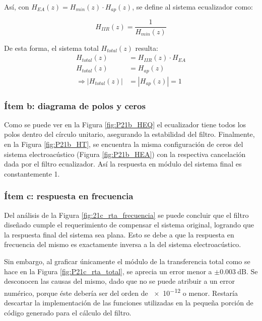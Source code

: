 	Así, con $H_{EA}(z) = H_{min}(z) \cdot H_{ap}(z)$, se define al sistema ecualizador como:

		\begin{equation*}
			H_{IIR}(z)  = \frac{1}{H_{min}(z)}
		\end{equation*}

	De esta forma, el sistema total $H_{total}(z)$ resulta:
		\begin{align*}
			H_{total}(z) &= H_{IIR}(z) \cdot H_{EA}\\
			H_{total}(z) &= H_{ap}(z)\\
			\Rightarrow |H_{total}(z)| &= |H_{ap}(z)| = 1
		\end{align*}


\subsubsection{Ítem b: diagrama de polos y ceros}

	
	Como se puede ver en la Figura \ref{fig:P21b_HEQ} el ecualizador tiene todos los polos dentro del círculo unitario, asegurando la estabilidad del filtro. Finalmente, en la Figura \ref{fig:P21b_HT}, se encuentra la misma configuración de ceros del sistema electroacústico (Figura \ref{fig:P21b_HEA}) con la respectiva cancelación dada por el filtro ecualizador. Así la respuesta en módulo del sistema final es constantemente 1.

\subsubsection{Ítem c: respuesta en frecuencia}


	Del análisis de la Figura \ref{fig:21c_rta_frecuencia} se puede concluir que el filtro diseñado cumple el requerimiento de compensar el sistema original, logrando que la respuesta final del sistema sea plana. Esto se debe a que la respuesta en frecuencia del mismo es exactamente inversa a la del sistema electroacústico. 
	
	Sin embargo, al graficar únicamente el módulo de la transferencia total como se hace en la Figura \ref{fig:P21c_rta_total}, se aprecia un error menor a $\pm \SI{0.003}{\dB}$. Se desconocen las causas del mismo, dado que no se puede atribuir a un error numérico, porque éste debería ser del orden de \num{e-12} o menor. Restaría descartar la implementación de las funciones utilizadas en la pequeña porción de código generado para el cálculo del filtro. 

